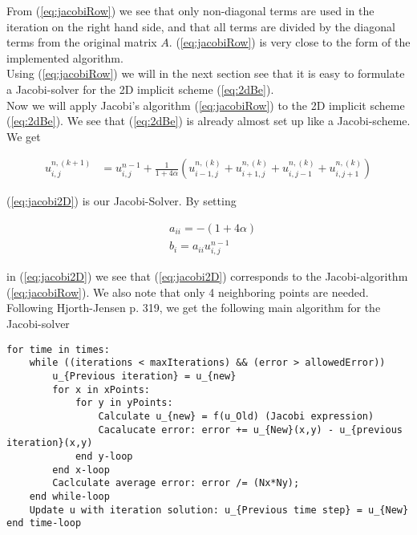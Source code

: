 \documentclass{article}
\begin{document}
From (\ref{eq:jacobiRow}) we see that only non-diagonal terms are used in the iteration on the right hand side, and that all terms are divided by the diagonal terms from the original matrix $A$. (\ref{eq:jacobiRow}) is very close to the form of the implemented algorithm.\\

Using (\ref{eq:jacobiRow}) we will in the next section see that it is easy to formulate a Jacobi-solver for the 2D implicit scheme (\ref{eq:2dBe}).\\

Now we will apply Jacobi's algorithm (\ref{eq:jacobiRow}) to the 2D implicit scheme (\ref{eq:2dBe}). We see that (\ref{eq:2dBe}) is already almost set up like a Jacobi-scheme. We get

\begin{subequations}\label{eq:jacobi2D}
	\begin{align}
				u_{i,j}^{n,(k+1)} &= u_{i,j}^{n-1}  + \frac{1}{1+4\alpha}(u_{i-1,j}^{n, (k)} 
		+ u_{i+1,j}^{n,(k)} + u_{i,j-1}^{n,(k)} + u_{i,j+1}^{n,(k)})
	\end{align}
\end{subequations}

(\ref{eq:jacobi2D}) is our Jacobi-Solver. By setting

\begin{subequations}
	\begin{align}
		&a_{ii} = -(1 + 4\alpha)\\
		&b_i = a_{ii} u_{i,j}^{n-1}
	\end{align}
\end{subequations}

in (\ref{eq:jacobi2D}) we see that (\ref{eq:jacobi2D}) corresponds to the Jacobi-algorithm (\ref{eq:jacobiRow}). We also note that only 4 neighboring points are needed.\\

Following Hjorth-Jensen \cite{MHJ} p. 319, we get the following main algorithm for the Jacobi-solver

\begin{lstlisting}
for time in times:
    while ((iterations < maxIterations) && (error > allowedError))
	    u_{Previous iteration} = u_{new}
		for x in xPoints:
			for y in yPoints:
				Calculate u_{new} = f(u_Old) (Jacobi expression)
				Cacalucate error: error += u_{New}(x,y) - u_{previous iteration}(x,y)
			end y-loop
		end x-loop
		Caclculate average error: error /= (Nx*Ny);
	end while-loop
	Update u with iteration solution: u_{Previous time step} = u_{New}
end time-loop
\end{lstlisting}
\end{document}
